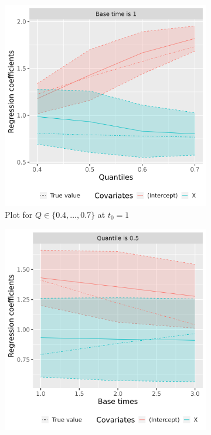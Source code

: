 \begin{figure}[ht] 
  \centering
  \begin{subfigure}[b]{0.47\linewidth}  
    \includegraphics[width = 1.0\textwidth]{simulation_smooth_quantile.png}
    \caption{Plot for $Q\in\{0.4, \ldots, 0.7\}$ at $t_0 = 1$}    
    \label{fig:simulation_quantile}
  \end{subfigure}
  \hfill
  \begin{subfigure}[b]{0.47\linewidth}
    \includegraphics[width = 1.0\textwidth]{simulation_smooth_t0.png}

\end{subfigure}
\end{figure}
